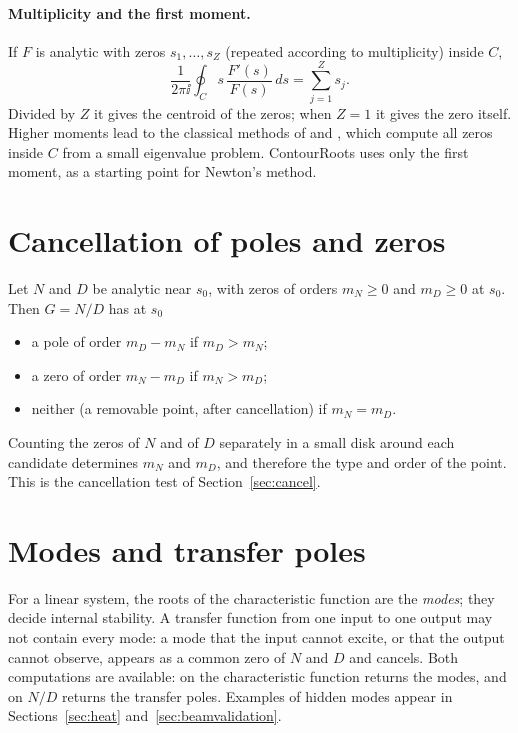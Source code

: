 \paragraph{Multiplicity and the first moment.} If $F$ is analytic with zeros
$s_1,\dots,s_Z$ (repeated according to multiplicity) inside $C$,
\begin{equation}
  \frac{1}{2\pi\ii}\oint_C s\,\frac{F'(s)}{F(s)}\,ds=\sum_{j=1}^{Z}s_j .
  \label{eq:moment}
\end{equation}
Divided by $Z$ it gives the centroid of the zeros; when $Z=1$ it gives the
zero itself. Higher moments lead to the classical methods of
\citet{delves1967} and \citet{kravanja2000}, which compute all zeros inside
$C$ from a small eigenvalue problem. ContourRoots uses only the first
moment, as a starting point for Newton's method.

\section{Cancellation of poles and zeros}

Let $N$ and $D$ be analytic near $s_0$, with zeros of orders $m_N\ge0$ and
$m_D\ge0$ at $s_0$. Then $G=N/D$ has at $s_0$
\begin{itemize}
  \item a pole of order $m_D-m_N$ if $m_D>m_N$;
  \item a zero of order $m_N-m_D$ if $m_N>m_D$;
  \item neither (a removable point, after cancellation) if $m_N=m_D$.
\end{itemize}
Counting the zeros of $N$ and of $D$ separately in a small disk around each
candidate determines $m_N$ and $m_D$, and therefore the type and order of
the point. This is the cancellation test of Section~\ref{sec:cancel}.

\section{Modes and transfer poles}

For a linear system, the roots of the characteristic function are the
\emph{modes}; they decide internal stability. A transfer function from one
input to one output may not contain every mode: a mode that the input
cannot excite, or that the output cannot observe, appears as a common zero
of $N$ and $D$ and cancels. Both computations are available: 
on the characteristic function returns the modes, and  on
$N/D$ returns the transfer poles. Examples of hidden modes appear in
Sections~\ref{sec:heat} and~\ref{sec:beamvalidation}.
